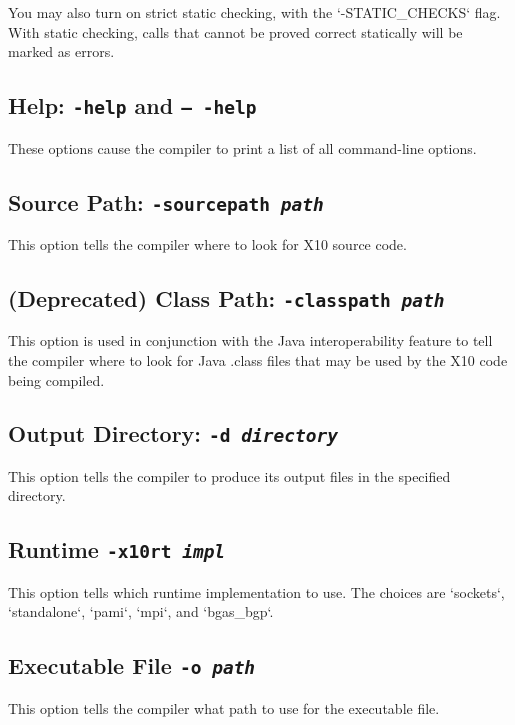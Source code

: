 You may also turn on strict static checking, with the \xcd`-STATIC_CHECKS` flag.  With
static checking, calls that cannot be proved correct statically will be
marked as errors.  


\subsection{Help: {\tt -help} and {\tt -- -help}}

These options cause the compiler to print a list of all command-line options.


\subsection{Source Path: {\tt -sourcepath {\em path}}}

This option tells the compiler where to look for X10 source code.  


\subsection{(Deprecated) Class Path: {\tt -classpath {\em path}}}

This option is used in conjunction with the Java interoperability
feature to tell the compiler where to look for Java .class files that
may be used by the X10 code being compiled.

\subsection{Output Directory: {\tt -d {\em directory}}}

This option tells the compiler to produce its output files in the specified directory.

\subsection{Runtime {\tt -x10rt {\em impl}}}

This option tells which runtime implementation to use.  The choices are
\xcd`sockets`, \xcd`standalone`, \xcd`pami`, \xcd`mpi`, and \xcd`bgas_bgp`.

\subsection{Executable File {\tt -o {\em path}}}

This option tells the compiler what path to use for the executable file. 

